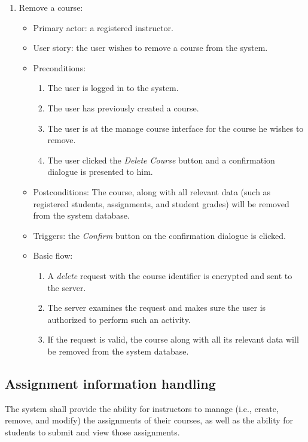 \begin{enumerate}
\item Remove a course:
\begin{itemize}
    \item Primary actor: a registered instructor.
    \item User story: the user wishes to remove a course from the system.
    \item Preconditions:
        \begin{enumerate}
            \item The user is logged in to the system.
            \item The user has previously created a course.
            \item The user is at the manage course interface for the course
                he wishes to remove.
            \item The user clicked the \emph{Delete Course} button and a
                confirmation dialogue is presented to him.
        \end{enumerate}
    \item Postconditions:
        The course, along with all relevant data (such as registered students,
        assignments, and student grades) will be removed from the system
        database.
    \item Triggers: the \emph{Confirm} button on the confirmation dialogue is
        clicked.
    \item Basic flow:
        \begin{enumerate}
            \item A \emph{delete} request with the course identifier is encrypted
                and sent to the server.
            \item The server examines the request and makes sure the user is
                authorized to perform such an activity.
            \item If the request is valid, the course along with all its
                relevant data will be removed from the system database.
        \end{enumerate}
\end{itemize}

\end{enumerate}

\subsection{Assignment information handling}
The system shall provide the ability for instructors to manage (i.e., create,
remove, and modify) the assignments of their courses, as well as the ability for
students to submit and view those assignments.


